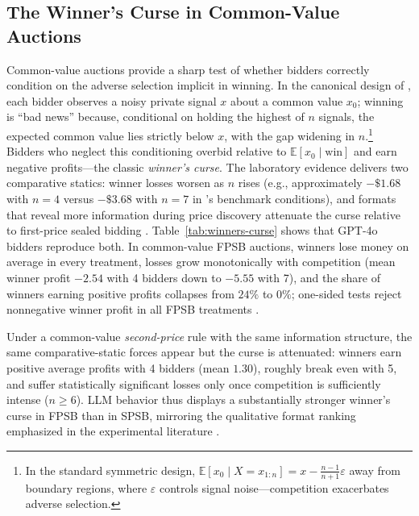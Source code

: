 \subsection{The Winner's Curse in Common-Value Auctions}\label{sec:validation-curse}

Common-value auctions provide a sharp test of whether bidders correctly condition on the adverse selection implicit in winning. In the canonical design of \citet{kagel1986winner}, each bidder observes a noisy private signal $x$ about a common value $x_0$; winning is ``bad news'' because, conditional on holding the highest of $n$ signals, the expected common value lies strictly below $x$, with the gap widening in $n$.\footnote{In the standard symmetric design, $\mathbb{E}[x_0 \mid X = x_{1:n}] = x - \frac{n-1}{n+1}\varepsilon$ away from boundary regions, where $\varepsilon$ controls signal noise---competition exacerbates adverse selection.} Bidders who neglect this conditioning overbid relative to $\mathbb{E}[x_0 \mid \text{win}]$ and earn negative profits---the classic \emph{winner's curse}. The laboratory evidence delivers two comparative statics: winner losses worsen as $n$ rises (e.g., approximately $-\$1.68$ with $n=4$ versus $-\$3.68$ with $n=7$ in \citeauthor{kagel1986winner}'s benchmark conditions), and formats that reveal more information during price discovery attenuate the curse relative to first-price sealed bidding \citep{levin1996revenue}. Table~\ref{tab:winners-curse} shows that GPT-4o bidders reproduce both. In common-value FPSB auctions, winners lose money on average in every treatment, losses grow monotonically with competition (mean winner profit $-2.54$ with 4 bidders down to $-5.55$ with 7), and the share of winners earning positive profits collapses from $24\%$ to $0\%$; one-sided tests reject nonnegative winner profit in all FPSB treatments \citep{kagel1986winner}.

Under a common-value \emph{second-price} rule with the same information structure, the same comparative-static forces appear but the curse is attenuated: winners earn positive average profits with 4 bidders (mean $1.30$), roughly break even with 5, and suffer statistically significant losses only once competition is sufficiently intense ($n \ge 6$). LLM behavior thus displays a substantially stronger winner's curse in FPSB than in SPSB, mirroring the qualitative format ranking emphasized in the experimental literature \citep{levin1996revenue}.


